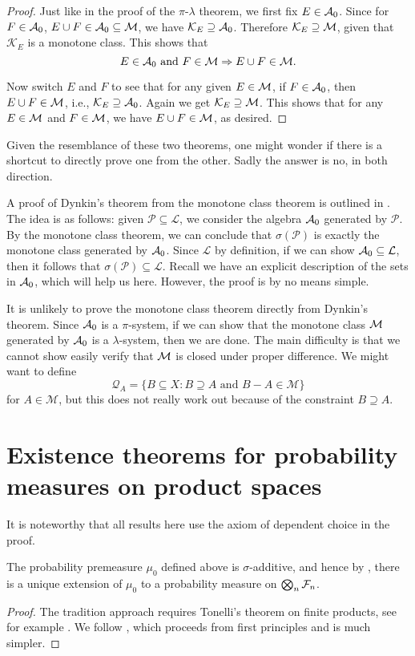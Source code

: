 \begin{proof}
Just like in the proof of the $\pi$-$\lambda$ theorem, we first fix $E\in\mathcal{A}_0$. Since for $F\in\mathcal{A}_0$, $E\cup F\in\mathcal{A}_0\subseteq\mathcal{M}$, we have
$\mathcal K_{E}\supseteq\mathcal{A}_0$. Therefore $\mathcal K_{E}\supseteq\mathcal{M}$, given that $\mathcal K_{E}$ is a monotone class.
This shows that 
\[
    E\in\mathcal{A}_0\text{ and }F\in\mathcal{M}\Rightarrow E\cup F\in\mathcal{M}.
\]

Now switch $E$ and $F$ to see that for any given $E\in\mathcal{M}$, if $F\in\mathcal{A}_0$, then $E\cup F\in\mathcal{M}$, i.e., $\mathcal K_{E}\supseteq\mathcal{A}_0$. Again we get $\mathcal K_{E}\supseteq\mathcal{M}$. This shows that for any $E\in\mathcal{M}$ and $F\in\mathcal{M}$, we have $E\cup F\in\mathcal{M}$, as desired.
\end{proof}

Given the resemblance of these two theorems, one might wonder if there is a shortcut to directly prove one from the other. Sadly the answer is no, in both direction.

A proof of Dynkin's theorem from the monotone class theorem is outlined in \cite[Exercise~3.12]{Billingsley_1995}. The idea is as follows: given $\mathcal P \subseteq \mathcal L$, we consider the algebra $\mathcal{A}_0$ generated by $\mathcal P$. By the monotone class theorem, we can conclude that $\sigma(\mathcal P)$ is exactly the monotone class generated by $\mathcal{A}_0$. Since $\mathcal L$ by definition, if we can show $\mathcal{A}_0 \subseteq \mathcal L$, then it follows that $\sigma(\mathcal P) \subseteq \mathcal L$. Recall we have an explicit description of the sets in $\mathcal{A}_0$, which will help us here. However, the proof is by no means simple.

It is unlikely to prove the monotone class theorem directly from Dynkin's theorem. Since $\mathcal{A}_0$ is a $\pi$-system, if we can show that the monotone class $\mathcal{M}$ generated by $\mathcal{A}_0$ is a $\lambda$-system, then we are done. The main difficulty is that we cannot show easily verify that $\mathcal{M}$ is closed under proper difference. We might want to define \[
    \mathcal{Q}_A = \{B \subseteq X : B \supseteq A \text{ and } B - A \in \mathcal M\}
\] for $A \in \mathcal M$, but this does not really work out because of the constraint $B \supseteq A$.

\section{Existence theorems for probability measures on product spaces}\label{sec:product-prob-meas}

It is noteworthy that all results here use the axiom of dependent choice in the proof.
\begin{namedthm} \label{thm:prod-prob-meas-countable-spaces}
    The probability premeasure $\mu_0$ defined above is $\sigma$-additive, and hence by , there is a unique extension of $\mu_0$ to a probability measure on $\bigotimes_{n} \mathcal{F}_n$.
\end{namedthm}
\begin{proof}
    The tradition approach requires Tonelli's theorem on finite products, see for example \cite[Section 6.3]{Ambrosio_2011}. We follow \cite{Saeki_1996}, which proceeds from first principles and is much simpler.
\end{proof}

